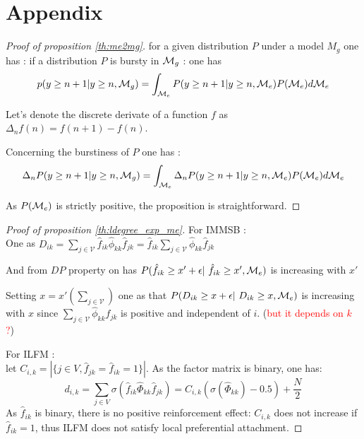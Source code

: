 \section{Appendix}

\begin{proof}[Proof of proposition \ref{th:me2mg}]
for a given distribution $P$ under a model $M_g$ one has : 
if a distribution $P$ is bursty in $\mathcal{M}_g$ : one has
\begin{equation*}
    p(y \geq n+1 | y \geq n, \mathcal{M}_g) = \int_{\mathcal{M}_e} P(y \geq n+1 | y \geq n, \mathcal{M}_e) P(\mathcal{M}_e) d\mathcal{M}_e
\end{equation*}

Let's denote the discrete derivate of a function $f$  as $\Delta_n f(n) = f(n+1) -f(n)$.

Concerning the burstiness of $P$ one has : 
\begin{equation}
    \Delta_n P(y \geq n+1 | y \geq n, \mathcal{M}_g) = \int_{\mathcal{M}_e}\Delta_n P(y \geq n+1 | y \geq n, \mathcal{M}_e) P(\mathcal{M}_e)d\mathcal{M}_e
\end{equation}

As $P(\mathcal{M}_e)$ is strictly positive, the proposition is straightforward.
\end{proof}



\begin{proof}[Proof of proposition \ref{th:ldegree_exp_me}]
For IMMSB : ~\\

One as 
$D_{ik} = \sum_{j\in\mathcal{V}} \hat f_{ik} \hat \phi_{kk} \hat f_{jk} = \hat f_{ik} \sum_{j\in\mathcal{V}} \hat \phi_{kk} \hat f_{jk}$

And from $DP$ property on has
$P(\hat f_{ik} \geq x' + \epsilon | \hat f_{ik} \geq x', \M_e)$ is increasing with $x'$

Setting $x = x' (\sum_{j\in\mathcal{V}})$ one as that $P(D_{ik} \geq x + \epsilon | D_{ik}
    \geq x, \M_e)$ is increasing with $x$ since $\sum_{j\in \mathcal{V}} \hat \phi_{kk}
    \hat f_{jk}$ is positive and independent of $i$. (\textcolor{red}{but it depends on
    $k$ ?})


For ILFM :~\\

 let $C_{i,k} = |\{j \in V, \hat{f}_{jk} = \hat{f}_{ik} = 1\}|$. As the factor matrix is
    binary, one has:
%
\[ 
d_{i,k} = \sum_{j\in V} \sigma(\hat{f}_{ik} \hat{\Phi}_{kk} \hat{f}_{jk}) =  C_{i,k} (\sigma(\hat{\Phi}_{kk})-0.5) + \frac{N}{2}
\]
%
As $\hat{f}_{ik}$ is binary, there is no positive reinforcement effect: $C_{i,k}$ does not
    increase if $\hat{f}_{ik}=1$, thus ILFM does not satisfy local preferential
    attachment.
\end{proof}

